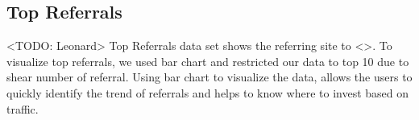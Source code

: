 \subsection{Top Referrals} \label{viztoprefs}
<TODO: Leonard>
Top Referrals data set shows the referring site to <>. To visualize
top referrals, we used bar chart and restricted our data to top 10 due
to shear number of referral. Using bar chart to visualize the data,
allows the users to quickly identify the trend of referrals and helps
to know where to invest based on traffic. 

